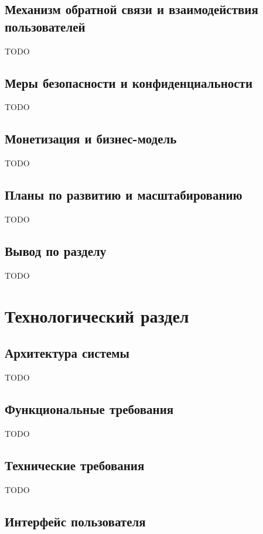 \documentclass{mirea}
\begin{document}
\subsection{Механизм обратной связи и взаимодействия пользователей}

TODO

\subsection{Меры безопасности и конфиденциальности}

TODO

\subsection{Монетизация и бизнес-модель}

TODO

\subsection{Планы по развитию и масштабированию}

TODO

\subsection*{Вывод по разделу}

TODO

\section{Технологический раздел}

\subsection{Архитектура системы}

TODO

\subsection{Функциональные требования}

TODO

\subsection{Технические требования}

TODO

\subsection{Интерфейс пользователя}
\end{document}

